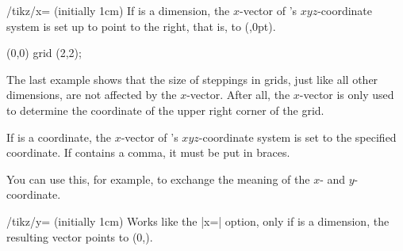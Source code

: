 \begin{key}{/tikz/x= (initially 1cm)}
    If  is a dimension, the $x$-vector of \pgfname's
    $xyz$-coordinate system is set up to point  to the right, that
    is, to (,0pt).
\begin{codeexample}[]
\end{codeexample}

\begin{codeexample}[]
\tikz \draw[x=1.5cm] (0,0) grid (2,2);
\end{codeexample}

    The last example shows that the size of steppings in grids, just like all
    other dimensions, are not affected by the $x$-vector. After all, the
    $x$-vector is only used to determine the coordinate of the upper right
    corner of the grid.

    If  is a coordinate, the $x$-vector of \pgfname's
    $xyz$-coordinate system is set to the specified coordinate. If 
    contains a comma, it must be put in braces.
\begin{codeexample}[]
\end{codeexample}

    You can use this, for example, to exchange the meaning of the $x$- and
    $y$-coordinate.
\begin{codeexample}[]
\end{codeexample}
\end{key}

\begin{key}{/tikz/y= (initially 1cm)}
    Works like the |x=| option, only if  is a dimension, the
    resulting vector points to (0,).
\end{key}

